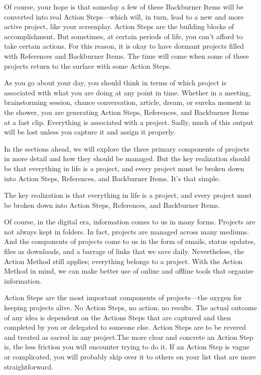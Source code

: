 Of course, your hope is that someday a few of these Backburner Items will be converted into real Action Steps—which will, in turn, lead to a new and more active project, like your screenplay. Action Steps are the building blocks of accomplishment. But sometimes, at certain periods of life, you can’t afford to take certain actions. For this reason, it is okay to have dormant projects filled with References and Backburner Items. The time will come when some of these projects return to the surface with some Action Steps.

As you go about your day, you should think in terms of which project is associated with what you are doing at any point in time. Whether in a meeting, brainstorming session, chance conversation, article, dream, or eureka moment in the shower, you are generating Action Steps, References, and Backburner Items at a fast clip. Everything is associated with a project. Sadly, much of this output will be lost unless you capture it and assign it properly.

In the sections ahead, we will explore the three primary components of projects in more detail and how they should be managed. But the key realization should be that everything in life is a project, and every project must be broken down into Action Steps, References, and Backburner Items. It’s that simple.

The key realization is that everything in life is a project, and every project must be broken down into Action Steps, References, and Backburner Items.

Of course, in the digital era, information comes to us in many forms. Projects are not always kept in folders. In fact, projects are managed across many mediums. And the components of projects come to us in the form of emails, status updates, files as downloads, and a barrage of links that we save daily. Nevertheless, the Action Method still applies; everything belongs to a project. With the Action Method in mind, we can make better use of online and offline tools that organize information.


Action Steps are the most important components of projects—the oxygen for keeping projects alive. No Action Steps, no action, no results. The actual outcome of any idea is dependent on the Actions Steps that are captured and then completed by you or delegated to someone else. Action Steps are to be revered and treated as sacred in any project.The more clear and concrete an Action Step is, the less friction you will encounter trying to do it. If an Action Step is vague or complicated, you will probably skip over it to others on your list that are more straightforward.

